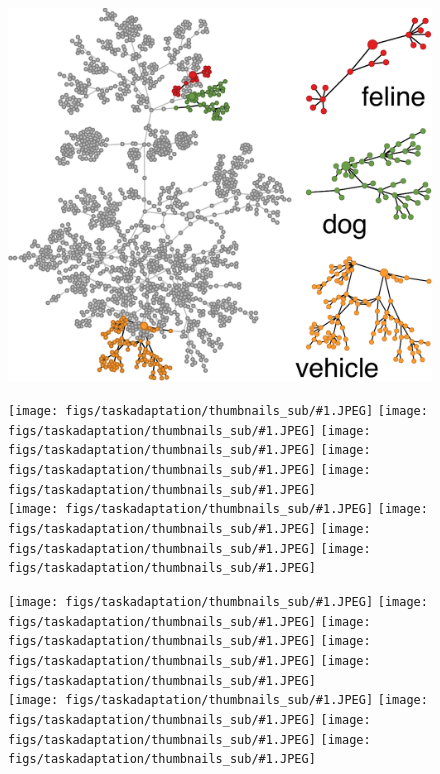 \begin{figure}
    \centering
    \newcommand{\introim}[1]{\texttt{[image: figs/taskadaptation/thumbnails\_sub/\#1.JPEG]}}
    \newcommand{\introsep}{\hspace{0.005\linewidth}}
    \newcommand{\demoim}[1]{\texttt{[image: figs/taskadaptation/thumbnails\_sub/\#1.JPEG]}}
    \begin{minipage}{0.5\linewidth}
    \includegraphics[width=1.\textwidth]{figs/taskadaptation/ilsvrc_graph_stitched.pdf}
    \end{minipage}\hfill
    \begin{minipage}{0.45\linewidth}
        \begin{flushleft}
        \introim{34544}\introsep
        \introim{82396}\introsep
        \introim{66068}\introsep
        \introim{36749}\introsep
        \introim{67538}\\
        \introim{19914}\introsep
        \introim{22979}\introsep
        \introim{101078}\introsep
        \introim{45885}\vspace{0.05in}

        \introim{62437}\introsep
        \introim{90868}\introsep
        \introim{84585}\introsep
        \introim{12176}\introsep
        \introim{83447}\\
        \introim{16261}\introsep
        \introim{111956}\introsep
        \introim{57158}\introsep
        \introim{26210}\vspace{0.05in}


\end{flushleft}
\end{minipage}
\end{figure}
